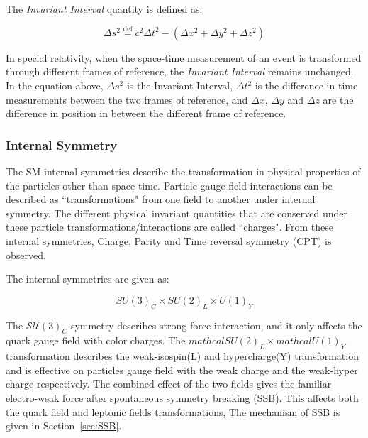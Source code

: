     The \textit{Invariant Interval} quantity is defined as:

    \begin{equation}
        \Delta s^2 \overset{\mathrm{def}}{=} c^{2}\Delta t^{2} - (\Delta x^{2}+\Delta y^{2} + \Delta z^{2})
        \label{eq:InvariantInterval}
    \end{equation}

    In special relativity, when the space-time measurement of an event is transformed through different frames of reference, the \textit{Invariant Interval} remains unchanged. In the equation above, $\Delta s^{2}$ is the Invariant Interval, $\Delta t^{2}$ is the difference in time measurements between the two frames of reference, and $\Delta x$, $\Delta y$ and $\Delta z$ are the difference in position in between the different frame of reference.

\subsubsection{Internal Symmetry}
The SM internal symmetries describe the transformation in physical properties of the particles other than space-time. Particle gauge field interactions can be described as ``transformations" from one field to another under internal symmetry. The different physical invariant quantities that are conserved under these particle transformations/interactions are called ``charges". From these internal symmetries, Charge, Parity and Time reversal symmetry (CPT) is observed. 

The internal symmetries are given as:

\begin{equation}
    SU(3)_{C} \times SU(2)_{L} \times U(1)_{Y}
\end{equation}


    

    The $\mathcal{SU}(3)_{C}$ symmetry describes strong force interaction, and it only affects the quark gauge field with color charges. The $mathcal{SU}(2)_{L} \times mathcal{U}(1)_{Y}$ transformation describes the weak-isospin(L) and hypercharge(Y) transformation and is effective on particles gauge field with the weak charge and the weak-hyper charge respectively. The combined effect of the two fields gives the familiar electro-weak force after spontaneous symmetry breaking (SSB). This affects both the quark field and leptonic fields transformations, The mechanism of SSB is given in Section~\ref{sec:SSB}.

